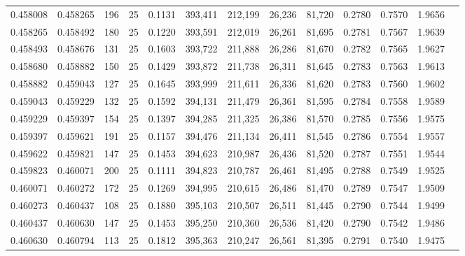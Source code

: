 \begin{tabular}{rrrrrrrrrrrrr}
0.458008 & 0.458265 &   196 &  25 &                                     0.1131 & 393,411 & 212,199 &  26,236 &  81,720 & 0.2780 & 0.7570 & 1.9656 \\
0.458265 & 0.458492 &   180 &  25 &                                     0.1220 & 393,591 & 212,019 &  26,261 &  81,695 & 0.2781 & 0.7567 & 1.9639 \\
0.458493 & 0.458676 &   131 &  25 &                                     0.1603 & 393,722 & 211,888 &  26,286 &  81,670 & 0.2782 & 0.7565 & 1.9627 \\
0.458680 & 0.458882 &   150 &  25 &                                     0.1429 & 393,872 & 211,738 &  26,311 &  81,645 & 0.2783 & 0.7563 & 1.9613 \\
0.458882 & 0.459043 &   127 &  25 &                                     0.1645 & 393,999 & 211,611 &  26,336 &  81,620 & 0.2783 & 0.7560 & 1.9602 \\
0.459043 & 0.459229 &   132 &  25 &                                     0.1592 & 394,131 & 211,479 &  26,361 &  81,595 & 0.2784 & 0.7558 & 1.9589 \\
0.459229 & 0.459397 &   154 &  25 &                                     0.1397 & 394,285 & 211,325 &  26,386 &  81,570 & 0.2785 & 0.7556 & 1.9575 \\
0.459397 & 0.459621 &   191 &  25 &                                     0.1157 & 394,476 & 211,134 &  26,411 &  81,545 & 0.2786 & 0.7554 & 1.9557 \\
0.459622 & 0.459821 &   147 &  25 &                                     0.1453 & 394,623 & 210,987 &  26,436 &  81,520 & 0.2787 & 0.7551 & 1.9544 \\
0.459823 & 0.460071 &   200 &  25 &                                     0.1111 & 394,823 & 210,787 &  26,461 &  81,495 & 0.2788 & 0.7549 & 1.9525 \\
0.460071 & 0.460272 &   172 &  25 &                                     0.1269 & 394,995 & 210,615 &  26,486 &  81,470 & 0.2789 & 0.7547 & 1.9509 \\
0.460273 & 0.460437 &   108 &  25 &                                     0.1880 & 395,103 & 210,507 &  26,511 &  81,445 & 0.2790 & 0.7544 & 1.9499 \\
0.460437 & 0.460630 &   147 &  25 &                                     0.1453 & 395,250 & 210,360 &  26,536 &  81,420 & 0.2790 & 0.7542 & 1.9486 \\
0.460630 & 0.460794 &   113 &  25 &                                     0.1812 & 395,363 & 210,247 &  26,561 &  81,395 & 0.2791 & 0.7540 & 1.9475 \\

\end{tabular}
